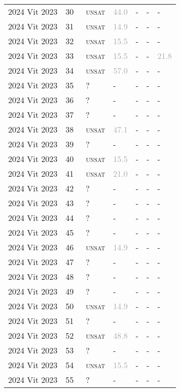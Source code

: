 \begin{center}
{\begin{longtable}{@{}lllllll@{}}
2024 Vit 2023 & 30 & ~\textsc{unsat} & \textcolor{darkgray}{44.0} & - & - & - \\
2024 Vit 2023 & 31 & ~\textsc{unsat} & \textcolor{darkgray}{14.9} & - & - & - \\
2024 Vit 2023 & 32 & ~\textsc{unsat} & \textcolor{darkgray}{15.5} & - & - & - \\
2024 Vit 2023 & 33 & ~\textsc{unsat} & \textcolor{darkgray}{15.5} & - & - & \textcolor{darkgray}{21.8} \\
2024 Vit 2023 & 34 & ~\textsc{unsat} & \textcolor{darkgray}{57.0} & - & - & - \\
2024 Vit 2023 & 35 & ~? & - & - & - & - \\
2024 Vit 2023 & 36 & ~? & - & - & - & - \\
2024 Vit 2023 & 37 & ~? & - & - & - & - \\
2024 Vit 2023 & 38 & ~\textsc{unsat} & \textcolor{darkgray}{47.1} & - & - & - \\
2024 Vit 2023 & 39 & ~? & - & - & - & - \\
2024 Vit 2023 & 40 & ~\textsc{unsat} & \textcolor{darkgray}{15.5} & - & - & - \\
2024 Vit 2023 & 41 & ~\textsc{unsat} & \textcolor{darkgray}{21.0} & - & - & - \\
2024 Vit 2023 & 42 & ~? & - & - & - & - \\
2024 Vit 2023 & 43 & ~? & - & - & - & - \\
2024 Vit 2023 & 44 & ~? & - & - & - & - \\
2024 Vit 2023 & 45 & ~? & - & - & - & - \\
2024 Vit 2023 & 46 & ~\textsc{unsat} & \textcolor{darkgray}{14.9} & - & - & - \\
2024 Vit 2023 & 47 & ~? & - & - & - & - \\
2024 Vit 2023 & 48 & ~? & - & - & - & - \\
2024 Vit 2023 & 49 & ~? & - & - & - & - \\
2024 Vit 2023 & 50 & ~\textsc{unsat} & \textcolor{darkgray}{14.9} & - & - & - \\
2024 Vit 2023 & 51 & ~? & - & - & - & - \\
2024 Vit 2023 & 52 & ~\textsc{unsat} & \textcolor{darkgray}{48.8} & - & - & - \\
2024 Vit 2023 & 53 & ~? & - & - & - & - \\
2024 Vit 2023 & 54 & ~\textsc{unsat} & \textcolor{darkgray}{15.5} & - & - & - \\
2024 Vit 2023 & 55 & ~? & - & - & - & - \\

\end{longtable}}
\end{center}
